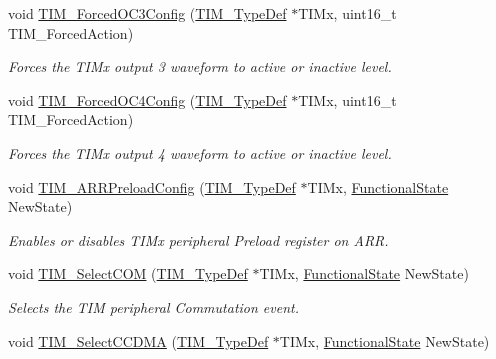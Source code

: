 \begin{DoxyCompactItemize}
void \mbox{\hyperlink{group___t_i_m___private___functions_ga920b0fb4ca44fceffd1c3e441feebd8f}{T\+I\+M\+\_\+\+Forced\+O\+C3\+Config}} (\mbox{\hyperlink{struct_t_i_m___type_def}{T\+I\+M\+\_\+\+Type\+Def}} $\ast$T\+I\+Mx, uint16\+\_\+t T\+I\+M\+\_\+\+Forced\+Action)
\begin{DoxyCompactList}\small\item\em Forces the T\+I\+Mx output 3 waveform to active or inactive level. \end{DoxyCompactList}\item 
void \mbox{\hyperlink{group___t_i_m___private___functions_gaf0a0bbe74251e56d4b835d20b0a3aa63}{T\+I\+M\+\_\+\+Forced\+O\+C4\+Config}} (\mbox{\hyperlink{struct_t_i_m___type_def}{T\+I\+M\+\_\+\+Type\+Def}} $\ast$T\+I\+Mx, uint16\+\_\+t T\+I\+M\+\_\+\+Forced\+Action)
\begin{DoxyCompactList}\small\item\em Forces the T\+I\+Mx output 4 waveform to active or inactive level. \end{DoxyCompactList}\item 
void \mbox{\hyperlink{group___t_i_m___private___functions_ga42b44b9fc2b0798d733720dd6bac1ac0}{T\+I\+M\+\_\+\+A\+R\+R\+Preload\+Config}} (\mbox{\hyperlink{struct_t_i_m___type_def}{T\+I\+M\+\_\+\+Type\+Def}} $\ast$T\+I\+Mx, \mbox{\hyperlink{group___exported__types_gac9a7e9a35d2513ec15c3b537aaa4fba1}{Functional\+State}} New\+State)
\begin{DoxyCompactList}\small\item\em Enables or disables T\+I\+Mx peripheral Preload register on A\+RR. \end{DoxyCompactList}\item 
void \mbox{\hyperlink{group___t_i_m___private___functions_gaff2e7f9959b1b36e830df028c14accc8}{T\+I\+M\+\_\+\+Select\+C\+OM}} (\mbox{\hyperlink{struct_t_i_m___type_def}{T\+I\+M\+\_\+\+Type\+Def}} $\ast$T\+I\+Mx, \mbox{\hyperlink{group___exported__types_gac9a7e9a35d2513ec15c3b537aaa4fba1}{Functional\+State}} New\+State)
\begin{DoxyCompactList}\small\item\em Selects the T\+IM peripheral Commutation event. \end{DoxyCompactList}\item 
void \mbox{\hyperlink{group___t_i_m___private___functions_ga5273cb65acb885fe7982827b1c6b7d75}{T\+I\+M\+\_\+\+Select\+C\+C\+D\+MA}} (\mbox{\hyperlink{struct_t_i_m___type_def}{T\+I\+M\+\_\+\+Type\+Def}} $\ast$T\+I\+Mx, \mbox{\hyperlink{group___exported__types_gac9a7e9a35d2513ec15c3b537aaa4fba1}{Functional\+State}} New\+State)

\end{DoxyCompactItemize}
